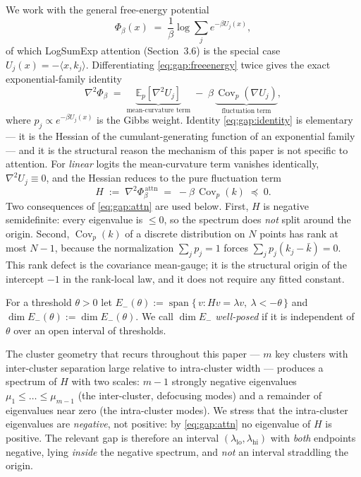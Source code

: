 We work with the general free-energy potential
\begin{equation}
  \Phi_\beta(x) \;=\; \frac1\beta \log \sum_{j} e^{-\beta U_j(x)},
  \label{eq:gap:freeenergy}
\end{equation}
of which LogSumExp attention (Section~3.6) is the special case
$U_j(x)=-\langle x,k_j\rangle$. Differentiating \eqref{eq:gap:freeenergy}
twice gives the exact exponential-family identity
\begin{equation}
  \nabla^2 \Phi_\beta
   \;=\; \underbrace{\mathbb{E}_p[\nabla^2 U_j]}_{\text{mean-curvature term}}
   \;-\; \beta\,\underbrace{\operatorname{Cov}_p(\nabla U_j)}_{\text{fluctuation term}},
  \label{eq:gap:identity}
\end{equation}
where $p_j \propto e^{-\beta U_j(x)}$ is the Gibbs weight. Identity
\eqref{eq:gap:identity} is elementary --- it is the Hessian of the
cumulant-generating function of an exponential family --- and it is the
structural reason the mechanism of this paper is not specific to attention.
For \emph{linear} logits the mean-curvature term vanishes identically,
$\nabla^2 U_j \equiv 0$, and the Hessian reduces to the pure fluctuation term
\begin{equation}
  H \;:=\; \nabla^2 \Phi_\beta^{\,\mathrm{attn}}
        \;=\; -\beta\,\operatorname{Cov}_p(k) \;\preceq\; 0.
  \label{eq:gap:attn}
\end{equation}
Two consequences of \eqref{eq:gap:attn} are used below. First, $H$ is
negative semidefinite: every eigenvalue is $\le 0$, so the spectrum does
\emph{not} split around the origin. Second, $\operatorname{Cov}_p(k)$ of a
discrete distribution on $N$ points has rank at most $N-1$, because the
normalization $\sum_j p_j = 1$ forces $\sum_j p_j (k_j-\bar k)=0$. This rank
defect is the covariance mean-gauge; it is the structural origin of the
intercept $-1$ in the rank-local law, and it does not require any fitted
constant.

\begin{definition}
\label{def:gap:Eminus}
For a threshold $\theta>0$ let
$E_-(\theta) := \operatorname{span}\{\,v : Hv=\lambda v,\ \lambda < -\theta\,\}$
and $\dim E_-(\theta) := \dim E_-(\theta)$. We call $\dim E_-$
\emph{well-posed} if it is independent of $\theta$ over an open interval of
thresholds.
\end{definition}

The cluster geometry that recurs throughout this paper --- $m$ key clusters
with inter-cluster separation large relative to intra-cluster width ---
produces a spectrum of $H$ with two scales: $m-1$ strongly negative
eigenvalues $\mu_1\le\dots\le\mu_{m-1}$ (the inter-cluster, defocusing modes)
and a remainder of eigenvalues near zero (the intra-cluster modes). We stress
that the intra-cluster eigenvalues are \emph{negative}, not positive: by
\eqref{eq:gap:attn} no eigenvalue of $H$ is positive. The relevant gap is
therefore an interval $(\lambda_{\mathrm{lo}},\lambda_{\mathrm{hi}})$ with
\emph{both} endpoints negative, lying \emph{inside} the negative spectrum, and
\emph{not} an interval straddling the origin.

